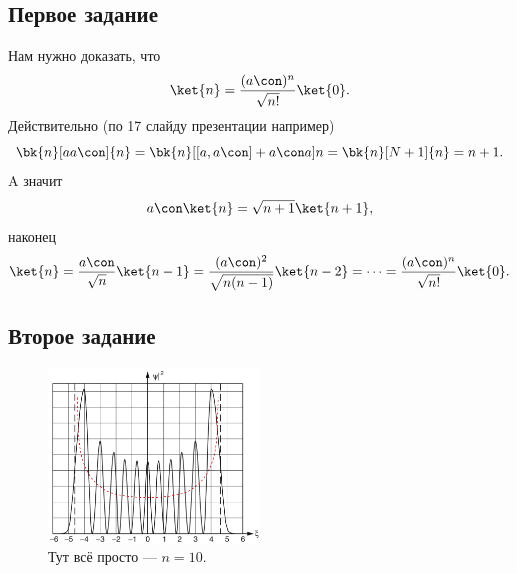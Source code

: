 \subsection*{Первое задание}
Нам нужно доказать, что
\begin{equation*}
	\ket{n} = \frac{(a\con)^n}{\sqrt{n!}} \ket{0}.
\end{equation*}
Действительно (по 17 слайду презентации например)
\begin{equation*}
	\bk{n}[a a\con]{n} = \bk{n}[[a, a\con]+ a\con a]{n} = \bk{n}[N+1]{n} = n+1.
\end{equation*}
A значит
\begin{equation*}
	a\con \ket{n} = \sqrt{n+1} \ket{n+1},
\end{equation*}
наконец
\begin{equation*}
	\ket{n} = \frac{a\con}{\sqrt{n}} \ket{n-1} = \frac{(a\con)^2}{\sqrt{n(n-1)}} \ket{n-2} = \cdots = \frac{(a\con)^n}{\sqrt{n!}} \ket{0}.
\end{equation*}

\subsection*{Второе задание}
    \begin{figure}[htb]
    \centering
    \includegraphics[width=0.5\textwidth]{img/lohmanscay_osc2.png}
    \caption{Тут всё просто --- $n = 10$.}
\end{figure}
    


